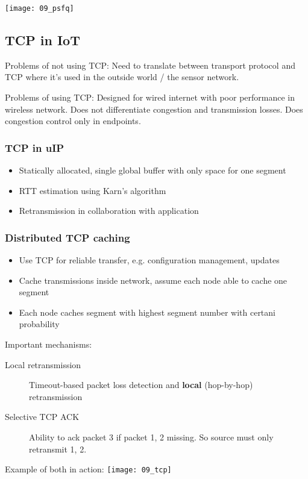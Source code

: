 \texttt{[image: 09\_psfq]}

\subsection{TCP in IoT}

Problems of not using TCP: Need to translate between transport protocol and TCP
where it's used in the outside world / the sensor network.

Problems of using TCP: Designed for wired internet with poor performance in
wireless network. Does not differentiate congestion and transmission losses.
Does congestion control only in endpoints.

\subsubsection{TCP in uIP}

\begin{itemize}
		\item Statically allocated, single global buffer with only space for one segment
		\item RTT estimation using Karn's algorithm
		\item Retransmission in collaboration with application
\end{itemize}

\subsubsection{Distributed TCP caching}

\begin{itemize}
		\item Use TCP for reliable transfer, e.g. configuration management, updates
		\item Cache transmissions inside network, assume each node able to cache one segment
		\item Each node caches segment with highest segment number with certani probability
\end{itemize}

Important mechanisms:

\begin{description}
		\item[Local retransmission] Timeout-based packet loss detection and \textbf{local} (hop-by-hop) retransmission
		\item[Selective TCP ACK] Ability to ack packet 3 if packet 1, 2 missing. So source must only retransmit 1, 2.
\end{description}

Example of both in action:
\texttt{[image: 09\_tcp]}
